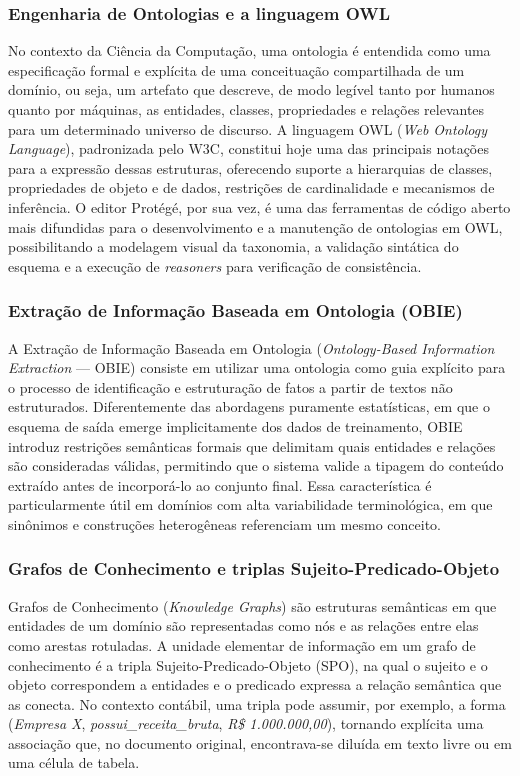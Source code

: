 \documentclass[12pt,a4paper]{article}
\begin{document}
\subsubsection{Engenharia de Ontologias e a linguagem OWL}

No contexto da Ciência da Computação, uma ontologia é entendida como uma especificação formal e explícita de uma conceituação compartilhada de um domínio, ou seja, um artefato que descreve, de modo legível tanto por humanos quanto por máquinas, as entidades, classes, propriedades e relações relevantes para um determinado universo de discurso. A linguagem OWL (\textit{Web Ontology Language}), padronizada pelo W3C, constitui hoje uma das principais notações para a expressão dessas estruturas, oferecendo suporte a hierarquias de classes, propriedades de objeto e de dados, restrições de cardinalidade e mecanismos de inferência. O editor Prot\'eg\'e, por sua vez, é uma das ferramentas de código aberto mais difundidas para o desenvolvimento e a manutenção de ontologias em OWL, possibilitando a modelagem visual da taxonomia, a validação sintática do esquema e a execução de \textit{reasoners} para verificação de consistência.

\subsubsection{Extração de Informação Baseada em Ontologia (OBIE)}

A Extração de Informação Baseada em Ontologia (\textit{Ontology-Based Information Extraction} --- OBIE) consiste em utilizar uma ontologia como guia explícito para o processo de identificação e estruturação de fatos a partir de textos não estruturados. Diferentemente das abordagens puramente estatísticas, em que o esquema de saída emerge implicitamente dos dados de treinamento, OBIE introduz restrições semânticas formais que delimitam quais entidades e relações são consideradas válidas, permitindo que o sistema valide a tipagem do conteúdo extraído antes de incorporá-lo ao conjunto final. Essa característica é particularmente útil em domínios com alta variabilidade terminológica, em que sinônimos e construções heterogêneas referenciam um mesmo conceito.

\subsubsection{Grafos de Conhecimento e triplas Sujeito-Predicado-Objeto}

Grafos de Conhecimento (\textit{Knowledge Graphs}) são estruturas semânticas em que entidades de um domínio são representadas como nós e as relações entre elas como arestas rotuladas. A unidade elementar de informação em um grafo de conhecimento é a tripla Sujeito-Predicado-Objeto (SPO), na qual o sujeito e o objeto correspondem a entidades e o predicado expressa a relação semântica que as conecta. No contexto contábil, uma tripla pode assumir, por exemplo, a forma (\textit{Empresa X}, \textit{possui\_receita\_bruta}, \textit{R\$ 1.000.000,00}), tornando explícita uma associação que, no documento original, encontrava-se diluída em texto livre ou em uma célula de tabela.
\end{document}
